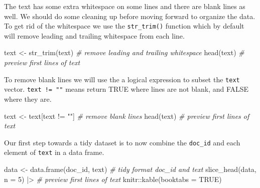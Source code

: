 \documentclass[
  letterpaper,
  DIV=11,
  numbers=noendperiod]{scrreport}
\newenvironment{Shaded}{\begin{snugshade}}{\end{snugshade}}
\newcommand{\AttributeTok}[1]{\textcolor[rgb]{0.00,0.00,0.00}{#1}}
\newcommand{\CommentTok}[1]{\textcolor[rgb]{0.00,0.00,0.00}{\textit{#1}}}
\newcommand{\ConstantTok}[1]{\textcolor[rgb]{0.00,0.00,0.00}{#1}}
\newcommand{\DecValTok}[1]{\textcolor[rgb]{0.00,0.00,0.00}{#1}}
\newcommand{\FunctionTok}[1]{\textcolor[rgb]{0.00,0.00,0.00}{#1}}
\newcommand{\NormalTok}[1]{\textcolor[rgb]{0.00,0.00,0.00}{#1}}
\newcommand{\OtherTok}[1]{\textcolor[rgb]{0.00,0.00,0.00}{#1}}
\newcommand{\SpecialCharTok}[1]{\textcolor[rgb]{0.00,0.00,0.00}{#1}}
\newcommand{\StringTok}[1]{\textcolor[rgb]{0.00,0.00,0.00}{#1}}
\theoremstyle{definition}
\theoremstyle{remark}
\begin{document}
The text has some extra whitespace on some lines and there are blank
lines as well. We should do some cleaning up before moving forward to
organize the data. To get rid of the whitespace we use the
\texttt{str\_trim()} function which by default will remove leading and
trailing whitespace from each line.

\begin{Shaded}
\begin{Highlighting}[]
\NormalTok{text }\OtherTok{\textless{}{-}} \FunctionTok{str\_trim}\NormalTok{(text) }\CommentTok{\# remove leading and trailing whitespace}
\FunctionTok{head}\NormalTok{(text) }\CommentTok{\# preview first lines of \textasciigrave{}text\textasciigrave{}}
\end{Highlighting}
\end{Shaded}

To remove blank lines we will use the a logical expression to subset the
\texttt{text} vector. \texttt{text\ !=\ ""} means return TRUE where
lines are not blank, and FALSE where they are.

\begin{Shaded}
\begin{Highlighting}[]
\NormalTok{text }\OtherTok{\textless{}{-}}\NormalTok{ text[text }\SpecialCharTok{!=} \StringTok{""}\NormalTok{] }\CommentTok{\# remove blank lines}
\FunctionTok{head}\NormalTok{(text) }\CommentTok{\# preview first lines of \textasciigrave{}text\textasciigrave{}}
\end{Highlighting}
\end{Shaded}

Our first step towards a tidy dataset is to now combine the
\texttt{doc\_id} and each element of \texttt{text} in a data frame.

\begin{Shaded}
\begin{Highlighting}[]
\NormalTok{data }\OtherTok{\textless{}{-}} \FunctionTok{data.frame}\NormalTok{(doc\_id, text) }\CommentTok{\# tidy format \textasciigrave{}doc\_id\textasciigrave{} and \textasciigrave{}text\textasciigrave{}}
\FunctionTok{slice\_head}\NormalTok{(data, }\AttributeTok{n =} \DecValTok{5}\NormalTok{) }\SpecialCharTok{|\textgreater{}} \CommentTok{\# preview first lines of \textasciigrave{}text\textasciigrave{}}
\NormalTok{  knitr}\SpecialCharTok{::}\FunctionTok{kable}\NormalTok{(}\AttributeTok{booktabs =} \ConstantTok{TRUE}\NormalTok{)}
\end{Highlighting}
\end{Shaded}
\end{document}
